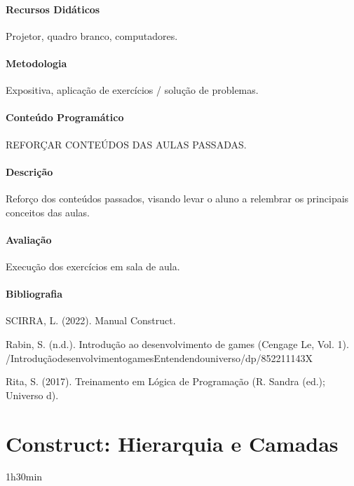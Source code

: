 \documentclass[letterpaper,10pt,brazil]{sphinxmanual}
\begin{document}
\subsubsection*{Recursos Didáticos}

\sphinxAtStartPar
Projetor, quadro branco, computadores.
\subsubsection*{Metodologia}

\sphinxAtStartPar
Expositiva, aplicação de exercícios / solução de problemas.
\subsubsection*{Conteúdo Programático}

\sphinxAtStartPar
REFORÇAR CONTEÚDOS DAS AULAS PASSADAS.
\subsubsection*{Descrição}

\sphinxAtStartPar
Reforço dos conteúdos passados, visando levar o aluno a relembrar os principais
conceitos das aulas.
\subsubsection*{Avaliação}

\sphinxAtStartPar
Execução dos exercícios em sala de aula.
\subsubsection*{Bibliografia}

\sphinxAtStartPar
SCIRRA, L. (2022). Manual Construct.

\sphinxAtStartPar
Rabin, S. (n.d.). Introdução ao desenvolvimento de games (Cengage Le, Vol. 1).
/Introdução\sphinxhyphen{}desenvolvimento\sphinxhyphen{}games\sphinxhyphen{}Entendendo\sphinxhyphen{}universo/dp/852211143X

\sphinxAtStartPar
Rita, S. (2017). Treinamento em Lógica de Programação (R. Sandra (ed.); Universo d).

\sphinxstepscope


\chapter{Construct: Hierarquia e Camadas}
\label{\detokenize{modelo_aula_12:construct-hierarquia-e-camadas}}\label{\detokenize{modelo_aula_12::doc}}
\sphinxAtStartPar
{} 1h30min
\end{document}
